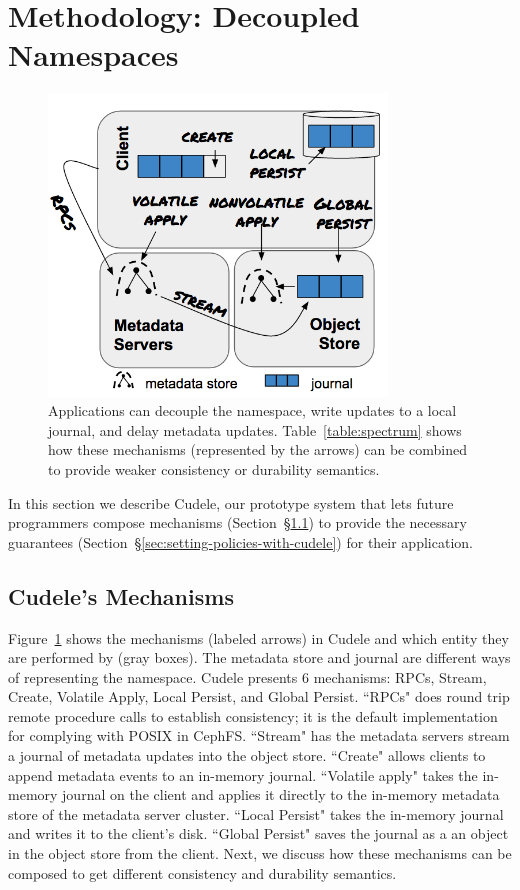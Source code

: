 \section{Methodology: Decoupled Namespaces}
\label{sec:methodology-decoupled-namespaces}

\begin{figure}[tb]
\caption{Applications can decouple the namespace, write updates to a local
journal, and delay metadata updates.  Table~\ref{table:spectrum} shows how
these mechanisms (represented by the arrows) can be combined to provide weaker
consistency or durability semantics.  }\label{fig:decouple}
\centering
\includegraphics[width=90mm]{figures/fig-decouple.png}
\end{figure}

In this section we describe Cudele, our prototype system that lets future
programmers compose mechanisms (Section~\S\ref{sec:cudeles-mechanisms}) to
provide the necessary guarantees
(Section~\S\ref{sec:setting-policies-with-cudele}) for their application.

\subsection{Cudele's Mechanisms}
\label{sec:cudeles-mechanisms}

Figure~\ref{fig:decouple} shows the mechanisms (labeled arrows) in Cudele and
which entity they are performed by (gray boxes). The metadata store and journal
are different ways of representing the namespace.  Cudele presents 6
mechanisms: RPCs, Stream, Create, Volatile Apply, Local Persist, and Global
Persist. ``RPCs" does round trip remote procedure calls to establish
consistency; it is the default implementation for complying with POSIX in
CephFS. ``Stream" has the metadata servers stream a journal of metadata updates
into the object store. ``Create" allows clients to append metadata events to an
in-memory journal. ``Volatile apply" takes the in-memory journal on the client
and applies it directly to the in-memory metadata store of the metadata server
cluster. ``Local Persist" takes the in-memory journal and writes it to the
client's disk. ``Global Persist" saves the journal as a an object in the object
store from the client.  Next, we discuss how these mechanisms can be composed
to get different consistency and durability semantics. 

